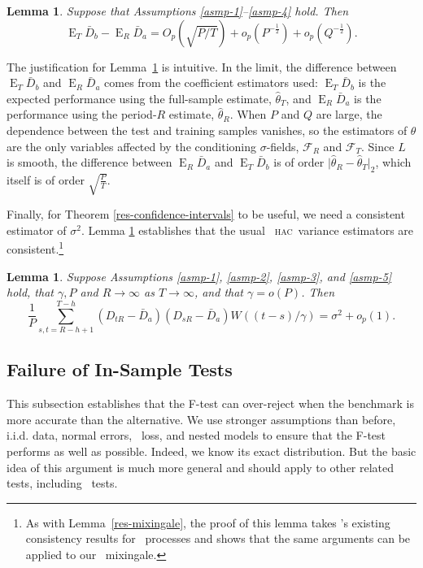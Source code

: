\documentclass[11pt]{article}
\newtheorem{lem}[thm]{Lemma}
\DeclareMathOperator{\E}{E}
\newcommand{\citepos}[1]{\citeauthor{#1}'s \citeyearpar{#1}}
\newcommand{\oosA}{\bar{D}_a}
\newcommand{\oosB}{\bar{D}_b}
\newcommand{\oosSum}[2]{\ensuremath{\sum_{#1=R-\h+#2}^{T-\h}}}
\newcommand{\h}{h}
\newcommand{\vWeight}{W((t-s)/\gamma)}
\newcommand{\hac}{\textsc{hac}}
\begin{document}
\begin{lem} \label{res-convergence} Suppose that Assumptions
  \ref{asmp-1}--\ref{asmp-4} hold.  Then
\begin{equation*}
  \E_T \oosB - \E_R \oosA =  O_p(\sqrt{P/T}) +
  o_p(P^{-\frac12}) + o_p(Q^{-\frac12}).
\end{equation*}
\end{lem}

The justification for Lemma~\ref{res-convergence} is intuitive.  In
the limit, the difference between $\E_T \oosB$ and $\E_R \oosA$
comes from the coefficient estimators used: $\E_T\oosB$ is the
expected performance using the full-sample estimate, $\hat{\theta}_T$,
and $\E_R \oosA$ is the performance using the period-$R$ estimate,
$\hat{\theta}_R$.  When $P$ and $Q$ are large, the dependence between
the test and training samples vanishes, so the estimators of $\theta$
are the only variables affected by the conditioning $\sigma$-fields,
$\mathcal{F}_R$ and $\mathcal{F}_T$.  Since $L$ is smooth, the
difference between $\E_R \oosA$ and $\E_T \oosB$ is of order
$\lvert \hat\theta_R - \hat\theta_T \rvert_2$, which itself is of
order $\sqrt{\frac{P}{T}}$.

Finally, for Theorem \ref{res-confidence-intervals} to be useful, we
need a consistent estimator of $\sigma^2$. Lemma
\ref{res-variance-estimator} establishes that the usual \oos\ \hac\
variance estimators are consistent.\footnote{As with
      Lemma~\ref{res-mixingale}, the proof of this lemma takes
      \citepos{DeD:00} existing consistency results
      for \ned\ processes and shows that the same arguments can be
      applied to our \oos\ mixingale.}

\begin{lem}
  \label{res-variance-estimator}  Suppose Assumptions \ref{asmp-1},
  \ref{asmp-2}, \ref{asmp-3}, and \ref{asmp-5} hold, that $\gamma, P$
  and $R \to \infty$ as $T \to \infty$, and that $\gamma = o(P)$.  Then
  \begin{equation*}
    \frac1P \oosSum{s,t}{1} (D_{tR} - \oosA)(D_{sR} - \oosA)
    \vWeight = \sigma^2 + o_p(1).
  \end{equation*}
\end{lem}


\subsection{Failure of In-Sample Tests}\label{sec:insample}
This subsection establishes that the F-test can over-reject when the
benchmark is more accurate than the alternative.  We use stronger
assumptions than before, i.i.d. data, normal errors, \mse\ loss, and
nested models to ensure that the F-test performs as well as possible.
Indeed, we know its exact distribution.  But the basic idea of this
argument is much more general and should apply to other related tests,
including \oos\ tests.
\end{document}

